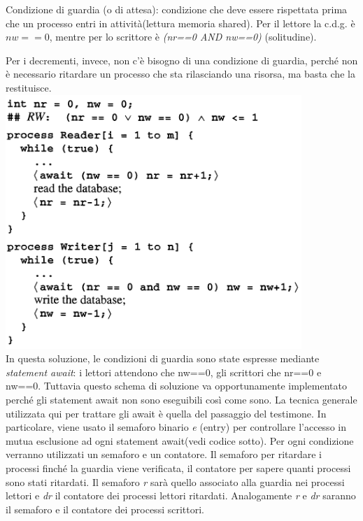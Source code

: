\documentclass[10pt,a4paper]{book}
\begin{document}
Condizione di guardia (o di attesa): condizione che deve essere rispettata prima che un processo entri in attività(lettura memoria shared).
Per il lettore la c.d.g. è $ nw == 0 $, mentre per lo scrittore è \textit{(nr==0 AND nw==0)} (solitudine).

Per i decrementi, invece, non c'è bisogno di una condizione di guardia, perché non è necessario ritardare un processo che sta rilasciando una risorsa, ma basta che la restituisce.\\\includegraphics[scale=0.41]{img/baton4.png} \\
In questa soluzione, le condizioni di guardia sono state espresse mediante \textit{statement await}: i lettori attendono che nw==0, gli scrittori che nr==0 e nw==0. Tuttavia questo schema di soluzione va opportunamente implementato perché gli statement await non sono eseguibili così come sono. 
La tecnica generale utilizzata qui per trattare gli await è quella del passaggio del testimone.
In particolare, viene usato il semaforo binario \textit{e} (entry) per controllare l'accesso in mutua esclusione ad ogni statement await(vedi codice sotto).
Per ogni condizione verranno utilizzati un semaforo e un contatore. Il semaforo per ritardare i processi finché la guardia viene verificata, il contatore per sapere quanti processi sono stati ritardati.
Il semaforo \textit{r} sarà quello associato alla guardia nei processi lettori e \textit{dr} il contatore dei processi lettori ritardati. Analogamente \textit{r} e \textit{dr} saranno il semaforo e il contatore dei processi scrittori.
\end{document}

